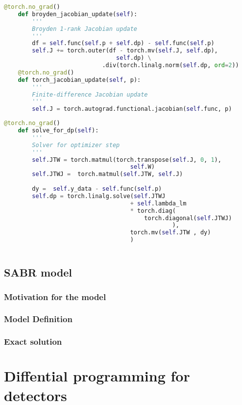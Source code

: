 \documentclass[]{beamer}
\begin{document}
\begin{frame}[fragile]
    \begin{lstlisting}[language=Python]
    @torch.no_grad()
    def broyden_jacobian_update(self):
        '''
        Broyden 1-rank Jacobian update
        '''
        df = self.func(self.p + self.dp) - self.func(self.p)
        self.J += torch.outer(df - torch.mv(self.J, self.dp),
                                self.dp) \
                            .div(torch.linalg.norm(self.dp, ord=2))
    @torch.no_grad()    
    def torch_jacobian_update(self, p):
        '''
        Finite-difference Jacobian update
        '''
        self.J = torch.autograd.functional.jacobian(self.func, p)
        \end{lstlisting}
\end{frame}


\begin{frame}[fragile]
    \begin{lstlisting}[language=Python]
    @torch.no_grad()        
    def solve_for_dp(self):
        '''
        Solver for optimizer step
        '''
        self.JTW = torch.matmul(torch.transpose(self.J, 0, 1),
                                    self.W)
        self.JTWJ =  torch.matmul(self.JTW, self.J)
        
        dy =  self.y_data - self.func(self.p)
        self.dp = torch.linalg.solve(self.JTWJ 
                                    + self.lambda_lm 
                                    * torch.diag(
                                        torch.diagonal(self.JTWJ)
                                                ), 
                                    torch.mv(self.JTW , dy)
                                    )
    
    \end{lstlisting}
\end{frame}





\subsection{SABR model}

\begin{frame}
    \frametitle{Motivation for the model}
\end{frame}

\begin{frame}
    \frametitle{Model Definition}
\end{frame}


\begin{frame}
    \frametitle{Exact solution}
\end{frame}



\subsection{}

\section{Diffential programming for detectors}
\begin{frame}
   
\end{frame}
\end{document}
